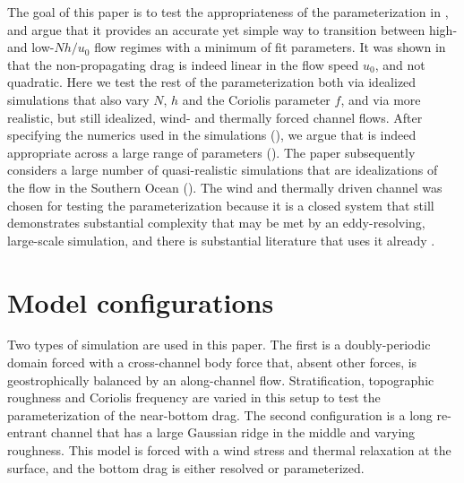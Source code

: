 \documentclass[twocol]{ametsocV5}
\begin{document}
The goal of this paper is to test the appropriateness of the parameterization in , and argue that it provides an accurate yet simple way to transition between high- and low-$Nh/u_0$ flow regimes with a minimum of fit parameters.  It was shown in \citet{klymak18} that the non-propagating drag is indeed linear in the flow speed $u_0$, and not quadratic.  Here we test the rest of the parameterization both via idealized simulations that also vary $N$, $h$ and the Coriolis parameter $f$, and via more realistic, but still idealized, wind- and thermally forced channel flows.  After specifying the numerics used in the simulations (), we argue that  is indeed appropriate across a large range of parameters ().  The paper subsequently considers a large number of quasi-realistic simulations that are idealizations of the flow in the Southern Ocean  ().  The wind and thermally driven channel was chosen for testing the parameterization because it is a closed system that still demonstrates substantial complexity that may be met by an eddy-resolving, large-scale simulation, and there is substantial literature that uses it already \citep[i.e.][]{abernatheycessi14,Marshall_2017}.





\section{Model configurations}
\label{sec:Model}

Two types of simulation are used in this paper.  The first is a doubly-periodic domain forced with a cross-channel body force that, absent other forces, is geostrophically balanced by an along-channel flow.  Stratification, topographic roughness and Coriolis frequency are varied in this setup to test the parameterization of the near-bottom drag.  The second configuration is a long re-entrant channel that has a large Gaussian ridge in the middle and varying roughness. This model is forced with a wind stress and thermal relaxation at the surface, and the bottom drag is either resolved or parameterized.
\end{document}
